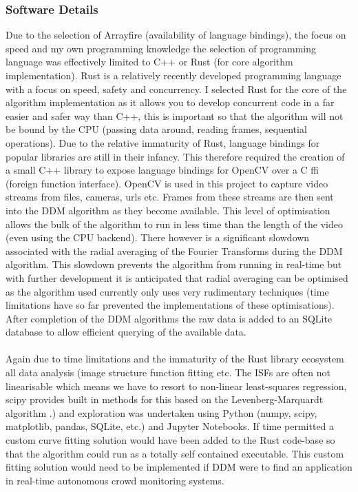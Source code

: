 \documentclass[10pt]{article}
\begin{document}
\subsubsection{Software Details}
Due to the selection of Arrayfire (availability of language bindings), the focus on speed and my own programming knowledge the selection of programming language was effectively limited to C++ or Rust \cite{rust} (for core algorithm implementation). Rust is a relatively recently developed programming language with a focus on speed, safety and concurrency. I selected Rust for the core of the algorithm implementation as it allows you to develop concurrent code in a far easier and safer way than C++, this is important so that the algorithm will not be bound by the CPU (passing data around, reading frames, sequential operations). Due to the relative immaturity of Rust, language bindings for popular libraries are still in their infancy. This therefore required the creation of a small C++ library to expose language bindings for OpenCV over a C ffi (foreign function interface). OpenCV is used in this project to capture video streams from files, cameras, urls etc. Frames from these streams are then sent into the DDM algorithm as they become available. This level of optimisation allows the bulk of the algorithm to run in less time than the length of the video (even using the CPU backend). There however is a significant slowdown associated with the radial averaging of the Fourier Transforms during the DDM algorithm. This slowdown prevents the algorithm from running in real-time but with further development it is anticipated that radial averaging can be optimised as the algorithm used currently only uses very rudimentary techniques (time limitations have so far prevented the implementations of these optimisations). After completion of the DDM algorithms the raw data is added to an SQLite database to allow efficient querying of the available data.
\\\\
Again due to time limitations and the immaturity of the Rust library ecosystem all data analysis (image structure function fitting etc. The ISFs are often not linearisable which means we have to resort to non-linear least-squares regression, scipy provides built in methods for this based on the Levenberg-Marquardt algorithm \cite{scipy_fit}.) and exploration was undertaken using Python (numpy, scipy, matplotlib, pandas, SQLite, etc.) and Jupyter Notebooks. If time permitted a custom curve fitting solution would have been added to the Rust code-base so that the algorithm could run as a totally self contained executable. This custom fitting solution would need to be implemented if DDM were to find an application in real-time autonomous crowd monitoring systems.
\end{document}
